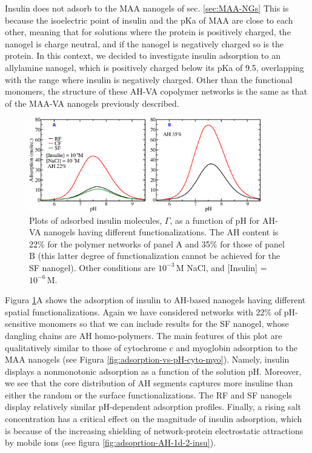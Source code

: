 {Insulin does not adsorb to the MAA nanogels of sec.  \ref{sec:MAA-NGs} %
This is because the isoelectric point of insulin and the pKa of MAA are close to each other, meaning that for solutions where the protein is positively charged, the nanogel is charge neutral, and if the nanogel is negatively charged so is the protein.
In this context, we decided to investigate insulin adsorption to an allylamine nanogel, which is positively charged below its pKa of 9.5, overlapping with the range where insulin is negatively charged.
Other than the functional monomers, the structure of these AH-VA copolymer networks is the same as that of the MAA-VA nanogels previously described.



\begin{figure}[!htb]
    \centering
    \includegraphics[width=0.9\textwidth]{Figures/graphs-gel2/insu-PAH.png}
    \caption{Plots of adsorbed insulin molecules, $\Gamma$, as a function of pH for  AH-VA nanogels having different functionalizations.
    The AH content is 22\% for the polymer networks of panel A and 35\% for those of panel B (this latter degree of functionalization cannot be achieved for the SF nanogel).
    Other conditions are $10^{-3}$\,M NaCl, and [Insulin] = $10^{-6}$\,M.}
    \label{fig:adsorption-vs-pH-insulin}
\end{figure}






Figura \ref{fig:adsorption-vs-pH-insulin}A shows the adsorption of insulin to AH-based nanogels having different spatial functionalizations.
Again we have considered networks with 22\% of pH-sensitive monomers so that we can include results for the SF nanogel, whose dangling chains are AH homo-polymers.
The main features of this plot are qualitatively similar to those of cytochrome c and myoglobin adsorption to the MAA nanogels (see Figura \ref{fig:adsorption-vs-pH-cyto-myo}).
Namely, insulin displays a  nonmonotonic adsorption as a function of the solution pH.
Moreover, we see that the core distribution of AH segments captures more insuline than either the random or the surface functionalizations.
The RF and SF nanogels display relatively similar pH-dependent adsorption profiles.
Finally, a rising salt concentration has a critical effect on the magnitude of insulin adsorption, which is because of the increasing shielding of network-protein electrostatic attractions by mobile ions (see  figura \ref{fig:adsoprtion-AH-1d-2-insu}).



}
